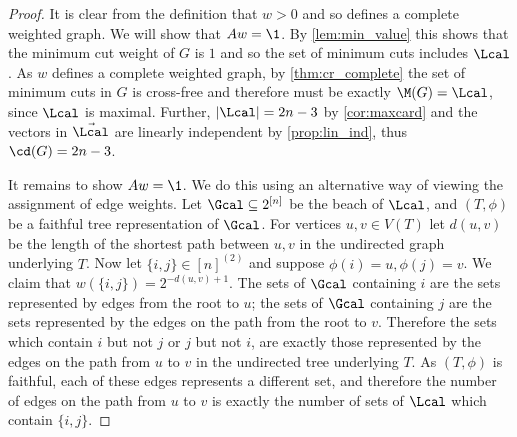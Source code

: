 \begin{proof}
It is clear from the definition that $w >0$ and so defines a complete weighted graph.
We will show that $Aw = \1$.  By \cref{lem:min_value} this shows that
the minimum cut weight of $G$ is $1$ and so the set of minimum cuts includes $\Lcal$.  As $w$ defines a complete weighted graph, by \cref{thm:cr_complete}
the set of minimum cuts in $G$ is cross-free and therefore must be exactly $\M(G) = \Lcal$, since $\Lcal$ is maximal.  Further, {$|\Lcal| = 2n-3$ by \cref{cor:maxcard} and}
the vectors in $\vec{\Lcal}$ are linearly independent by \cref{prop:lin_ind}, thus $\cd(G) = 2n-3$.

It remains to show $Aw = \1$.
We do this using an alternative way of viewing the assignment of edge weights.
Let $\Gcal \subseteq 2^{[n]}$ be the beach of $\Lcal$, and $(T,\phi)$ be a faithful
tree representation of $\Gcal$.  For vertices $u,v \in V(T)$ let $d(u,v)$ be the length of the shortest path between $u,v$ in the undirected graph underlying $T$.
Now let $\{i,j\} \in [n]^{(2)}$ and suppose $\phi(i) = u, \phi(j) = v$.  We claim that $w(\{i,j\}) = 2^{-d(u,v)+1}$.
The sets of $\Gcal$ containing $i$ are the sets represented by edges from the root to $u$;  the sets of $\Gcal$ containing
$j$ are the sets represented by the edges on the path from the root to $v$.  Therefore the sets which contain $i$ but not $j$ or $j$ but
not $i$, are exactly those represented by the edges on the path from $u$ to $v$ in the undirected tree underlying $T$.  As $(T,\phi)$ is faithful,
each of these edges represents a different set, and therefore the number of edges on the path from $u$ to $v$ is exactly the number of
sets of $\Lcal$ which contain $\{i,j\}$.


\end{proof}
